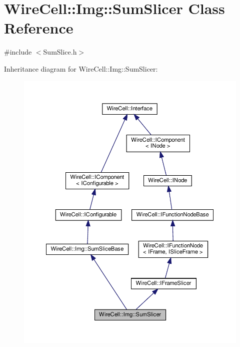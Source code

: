 \hypertarget{class_wire_cell_1_1_img_1_1_sum_slicer}{}\section{Wire\+Cell\+:\+:Img\+:\+:Sum\+Slicer Class Reference}
\label{class_wire_cell_1_1_img_1_1_sum_slicer}


{\ttfamily \#include $<$Sum\+Slice.\+h$>$}



Inheritance diagram for Wire\+Cell\+:\+:Img\+:\+:Sum\+Slicer\+:
\nopagebreak
\begin{figure}[H]
\begin{center}
\leavevmode
\includegraphics[width=350pt]{class_wire_cell_1_1_img_1_1_sum_slicer__inherit__graph}
\end{center}
\end{figure}


